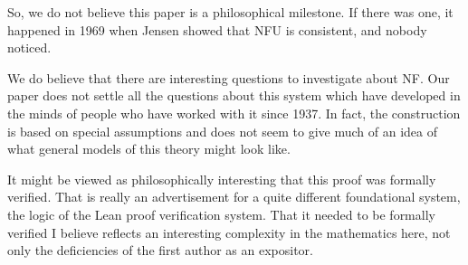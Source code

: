 \documentclass[112pt]{article}
\begin{document}
So, we do not believe this paper is a philosophical milestone.  If there was one, it happened in 1969 when Jensen showed that NFU is consistent, and nobody noticed.

We do believe that there are interesting questions to investigate about NF.  Our paper does not settle all the questions about this system which have developed in the minds of people who have worked with it since 1937.  In fact, the construction is based on special assumptions  and does not seem to give much of an idea of what general models of this theory might look like.

It might be viewed as philosophically interesting that this proof was formally verified.  That is really an advertisement for a quite different foundational system, the logic of the Lean proof verification system.   That it needed to be formally verified I believe reflects an interesting complexity in the mathematics here, not only the deficiencies of the first author as an expositor.



\newpage
\end{document}
